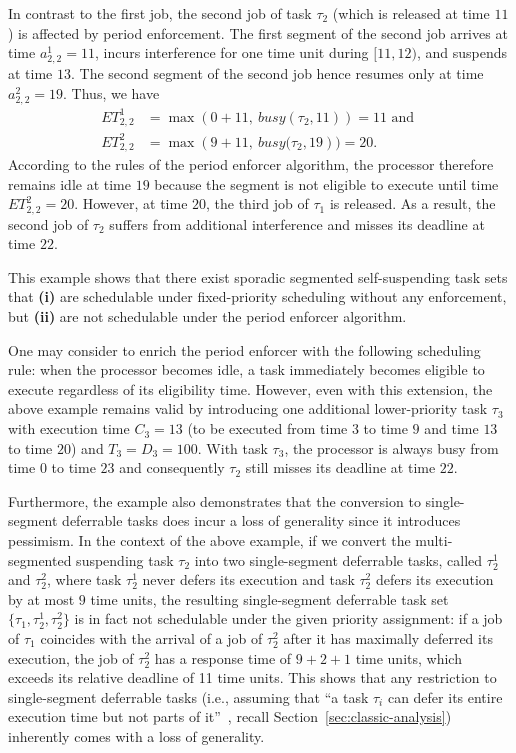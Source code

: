 In contrast to the first job, the second job of task $\tau_2$ (which is released at time $11$) is affected by period enforcement. The first segment of the second job arrives at time $a^1_{2,2} = 11$, incurs interference for one time unit during $[11, 12)$, and suspends at time $13$. The  second segment of the second job hence resumes only at time $a^2_{2,2} = 19$. Thus, we have
\begin{align*}
	ET_{2,2}^1 & = \max\left(0 + 11,\ \mathit{busy}(\tau_2, 11)\right) = 11  \text{ and }
\\
	ET_{2,2}^2 & = \max\left(9 + 11,\ \mathit{busy}(\tau_2, 19\right) ) = 20.
\end{align*}
According to the rules of the period enforcer algorithm, the processor therefore remains idle at time $19$ because the segment is not eligible to execute until time $ET_{2,2}^2 = 20$. However, at time $20$, the third job of $\tau_1$ is released. As a result, the second job of $\tau_2$ suffers from additional interference and misses its deadline at time $22$.




This example shows that there exist sporadic segmented self-suspending task sets that   \textbf{(i)} are schedulable under fixed-priority scheduling without any enforcement, but \textbf{(ii)} are not schedulable under the period enforcer algorithm.


One may consider to enrich the period enforcer with the following scheduling rule: when the processor becomes idle, a task immediately becomes eligible to execute regardless of its eligibility time. However, even with this extension, the above example remains valid by introducing one additional lower-priority task $\tau_3$ with execution time $C_3=13$ (to be executed from time $3$ to time $9$ and time $13$ to time $20$) and $T_3=D_3=100$. With task $\tau_3$, the processor is always busy from time $0$ to time $23$ and consequently $\tau_2$ still misses its deadline at time $22$.




Furthermore, the example also demonstrates that the conversion to single-segment deferrable tasks does incur a loss of generality since it introduces pessimism. In the context of the above example, if we convert the multi-segmented suspending task $\tau_2$ into two single-segment deferrable tasks, called $\tau_2^1$ and $\tau_2^2$, where task $\tau_2^1$ never defers its execution and task $\tau_2^2$ defers its execution by at most \emph{$9$} time units, the resulting single-segment deferrable task set $\{\tau_1, \tau_2^1, \tau_2^2\}$ is in fact not schedulable under the given priority assignment: if a job of $\tau_1$ coincides with the arrival of a job of $\tau_2^2$ after it has maximally deferred its execution, the job of $\tau_2^2$ has a response time of $9 + 2 + 1$ time units, which exceeds its relative deadline of 11 time units. This shows that any restriction to single-segment deferrable tasks (i.e., assuming that ``a task $\tau_i$ can defer its entire execution time but not parts of it''~\cite{Raj:suspension1991}, recall Section~\ref{sec:classic-analysis}) inherently comes with a loss of generality.



